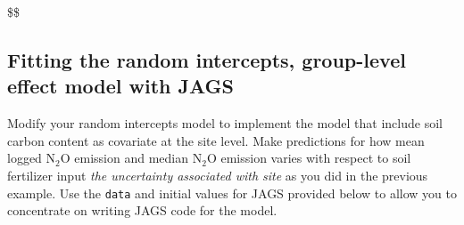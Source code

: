 \documentclass[
]{article}
\begin{document}
\$\$

\hypertarget{fitting-the-random-intercepts-group-level-effect-model-with-jags}{%
\subsection{Fitting the random intercepts, group-level effect model with
JAGS}\label{fitting-the-random-intercepts-group-level-effect-model-with-jags}}

Modify your random intercepts model to implement the model that include
soil carbon content as covariate at the site level. Make predictions for
how mean logged \(\textrm{N} _2 \textrm{O}\) emission and median
\(\textrm{N} _2 \textrm{O}\) emission varies with respect to soil
fertilizer input \emph{the uncertainty associated with site} as you did
in the previous example. Use the \texttt{data} and initial values for
JAGS provided below to allow you to concentrate on writing JAGS code for
the model.
\end{document}
